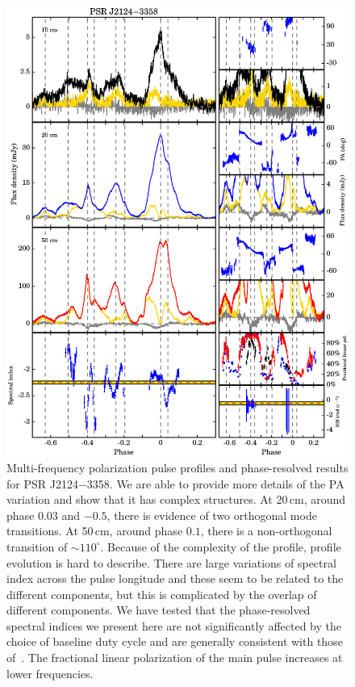 \documentclass[useAMS,usenatbib]{mn2e}
\begin{document}
\begin{appendix}
\begin{figure}
\begin{center}
\includegraphics[width=6 in]{2124.ps}
\caption{Multi-frequency polarization pulse profiles and phase-resolved results for PSR J2124$-$3358. 
We are able to provide more details of the PA variation and show that it has 
complex structures.
%
At 20\,cm, around phase $0.03$ and $-0.5$, there is evidence of two 
orthogonal mode transitions.
%
At 50\,cm, around phase $0.1$, there is a non-orthogonal transition of 
$\sim110^{\circ}$.
%
Because of the complexity of the profile, profile evolution is hard to 
describe. There are large variations of spectral index across the pulse 
longitude and these seem to be related to the different components, but 
this is complicated by the overlap of different components.
%
We have tested that the phase-resolved spectral indices we present here are 
not significantly affected by the choice of baseline duty cycle and are 
generally consistent with those of~\citet{Manchester04}.
%
The fractional linear polarization of the main pulse increases at lower 
frequencies.
}
\label{2124}
\end{center}
\end{figure}


\end{appendix}
\end{document}
